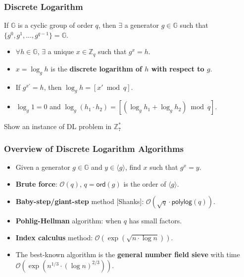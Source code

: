 \begin{frame}\frametitle{Discrete Logarithm}
If $\mathbb{G}$ is a cyclic group of order $q$, then $\exists$ a generator $g \in \mathbb{G}$ such that $\{ g^0,g^1,\dotsc,g^{q-1}\} = \mathbb{G}$.
\begin{itemize}
\item $\forall h \in \mathbb{G}$, $\exists$ a unique $x \in \mathbb{Z}_q$ such that $g^x = h$.
\item $x= \log_gh$ is the \textbf{\textbf{discrete logarithm} of $h$ with respect to $g$}.
\item If $g^{x'}=h$, then $\log_gh = [x' \bmod q]$.
\item $\log_g1=0$ and $\log_g(h_1\cdot h_2) = [(\log_gh_1+\log_gh_2) \bmod q]$.
\end{itemize}
\begin{exampleblock}{}
Show an instance of DL problem in $\mathbb{Z}_{7}^{*}$
\end{exampleblock}
\end{frame}
\begin{frame}\frametitle{Overview of Discrete Logarithm Algorithms}
\begin{itemize}
\item Given a generator $g \in \mathbb{G}$ and $y \in \langle g \rangle$, find $x$ such that $g^x=y$.
\item \textbf{Brute force}: $\mathcal{O}(q)$, $q = \mathsf{ord}(g)$ is the order of $\langle g\rangle$.
\item \textbf{Baby-step/giant-step} method [Shanks]: $\mathcal{O}(\sqrt{q}\cdot \mathsf{polylog}(q))$.
\item \textbf{Pohlig-Hellman} algorithm: when $q$ has small factors.
\item \textbf{Index calculus} method: $\mathcal{O}(\exp{(\sqrt{n\cdot \log n})})$.
\item The best-known algorithm is the \textbf{general number field sieve} with time $\mathcal{O}(\exp(n^{1/3}\cdot(\log n)^{2/3}))$.
\end{itemize}
\end{frame}
